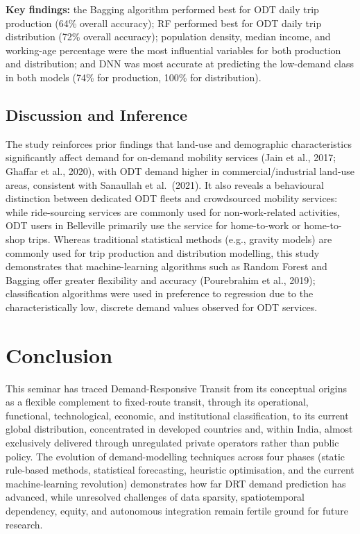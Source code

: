 \documentclass[12pt]{article}
\begin{document}
\textbf{Key findings:} the Bagging algorithm performed best for ODT daily trip
production (64\% overall accuracy); RF performed best for ODT daily trip
distribution (72\% overall accuracy); population density, median income, and
working-age percentage were the most influential variables for both production and
distribution; and DNN was most accurate at predicting the low-demand class in both
models (74\% for production, 100\% for distribution).

\subsection{Discussion and Inference}

The study reinforces prior findings that land-use and demographic characteristics
significantly affect demand for on-demand mobility services (Jain et al., 2017;
Ghaffar et al., 2020), with ODT demand higher in commercial/industrial land-use
areas, consistent with Sanaullah et al.\ (2021). It also reveals a behavioural
distinction between dedicated ODT fleets and crowdsourced mobility services: while
ride-sourcing services are commonly used for non-work-related activities, ODT users
in Belleville primarily use the service for home-to-work or home-to-shop trips.
Whereas traditional statistical methods (e.g., gravity models) are commonly used
for trip production and distribution modelling, this study demonstrates that
machine-learning algorithms such as Random Forest and Bagging offer greater
flexibility and accuracy (Pourebrahim et al., 2019); classification algorithms were
used in preference to regression due to the characteristically low, discrete demand
values observed for ODT services.

\section{Conclusion}

This seminar has traced Demand-Responsive Transit from its conceptual origins as a
flexible complement to fixed-route transit, through its operational, functional,
technological, economic, and institutional classification, to its current
global distribution, concentrated in developed countries and, within India,
almost exclusively delivered through unregulated private operators rather than
public policy. The evolution of demand-modelling techniques across four phases
(static rule-based methods, statistical forecasting, heuristic optimisation, and
the current machine-learning revolution) demonstrates how far DRT demand
prediction has advanced, while unresolved challenges of data sparsity,
spatiotemporal dependency, equity, and autonomous integration remain fertile
ground for future research.
\end{document}
